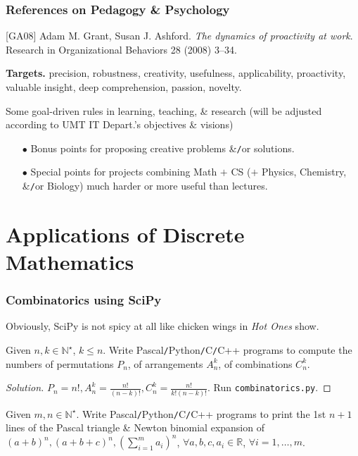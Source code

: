 \documentclass{beamer}
\begin{document}
\begin{frame}
	\frametitle{References on Pedagogy \& Psychology}
	[GA08] {\sc Adam M. Grant, Susan J. Ashford}. {\it The dynamics of proactivity at work}. Research in Organizational Behaviors 28 (2008) 3--34.
	\vspace{5mm}
	
	{\bf Targets.} precision, robustness, creativity, usefulness, applicability, proactivity, valuable insight, deep comprehension, passion, novelty.
	\begin{block}{Some goal-driven rules in learning, teaching, \& research}
		(will be adjusted according to UMT IT Depart.'s objectives \& visions)
		\begin{itemize}
			\item[$\bullet$] Bonus points for proposing creative problems \&{\tt/}or solutions.
			\item[$\bullet$] Special points for projects combining Math $+$ CS ($+$ Physics, Chemistry, \&{\tt/}or Biology) much harder or more useful than lectures.
		\end{itemize}
	\end{block}
\end{frame}

\section{Applications of Discrete Mathematics}

\begin{frame}
	\frametitle{Combinatorics using SciPy}
	Obviously, SciPy is not spicy at all like chicken wings in {\it Hot Ones} show.
	\begin{problem}
		Given $n,k\in\mathbb{N}^\star$, $k\le n$. Write {\sf Pascal{\tt/}Python{\tt/}C{\tt/}C++} programs to compute the numbers of permutations $P_n$, of arrangements $A_n^k$, of combinations $C_n^k$.
	\end{problem}
	
	\begin{proof}[Solution]
		$P_n = n!,A_n^k = \frac{n!}{(n - k)!},C_n^k = \frac{n!}{k!(n - k)!}$. Run {\tt combinatorics.py}.		
	\end{proof}
	
	\begin{problem}
		Given $m,n\in\mathbb{N}^\star$. Write {\sf Pascal{\tt/}Python{\tt/}C{\tt/}C++} programs to print the 1st $n + 1$ lines of the Pascal triangle \& Newton binomial expansion of $(a + b)^n,(a + b + c)^n,\left(\sum_{i=1}^m a_i\right)^n$,  $\forall a,b,c,a_i\in\mathbb{R}$, $\forall i = 1,\ldots,m$.
	\end{problem}
\end{frame}
\end{document}
